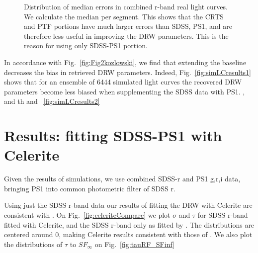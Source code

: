 \documentclass[twocolumn]{aastex62}
\begin{document}
\begin{figure}%
\caption{Distribution of median errors in combined r-band real light curves. We calculate the median per segment. This shows that the CRTS and PTF portions have much larger errors than SDSS, PS1, and are therefore less useful in improving the DRW parameters. This is the reason for using only SDSS-PS1 portion.  }
\label{fig:combinedLCerrors}
\end{figure} 


In accordance with Fig.~\ref{fig:Fig2kozlowski}, we find that extending the baseline decreases the bias in retrieved DRW parameters. Indeed, Fig.~\ref{fig:simLCresults1} shows that for an ensemble of 6444 simulated light curves the  recovered DRW parameters become less biased when supplementing the SDSS data with PS1. , and th and ~\ref{fig:simLCresults2} 

\begin{figure*}
\caption{Retrieved $\tau$ and $\sigma$  parameters for simulated LCs. }
\label{fig:simLCresults1}
\end{figure*} 

\begin{figure*}
\caption{Comparison of retrieved parameters in relation to input parameters, shown as Fig.18 in \citet{macleod2011} }
\label{fig:simLCresults2}
\end{figure*} 


\section{Results: fitting SDSS-PS1 with Celerite}

Given the results of simulations, we use combined SDSS-r and PS1 g,r,i data, bringing PS1  into common photometric filter of SDSS r. 

Using just the SDSS r-band data our results of fitting the DRW with Celerite are consistent with \citet{macleod2011}. On Fig.~\ref{fig:celeriteCompare} we plot $\sigma$ and $\tau$ for SDSS r-band fitted with Celerite, and the SDSS r-band only as fitted by 
\citet{macleod2011}. The distributions are centered around 0, making Celerite results consistent with those of \citet{macleod2011}.  We also plot the distributions of $\tau$ to $SF_{\infty}$ on Fig.~\ref{fig:tauRF_SFinf}




\begin{figure*}
\caption{Plot comparing results for SDSS r-band fitting of \citet{macleod2011} ($\sigma_{m}, \tau_{m}$), and current results for SDSS r-band using Celerite ($\sigma_{fit}, \tau_{fit}$). }
\label{fig:celeriteCompare}
\end{figure*} 
\end{document}
